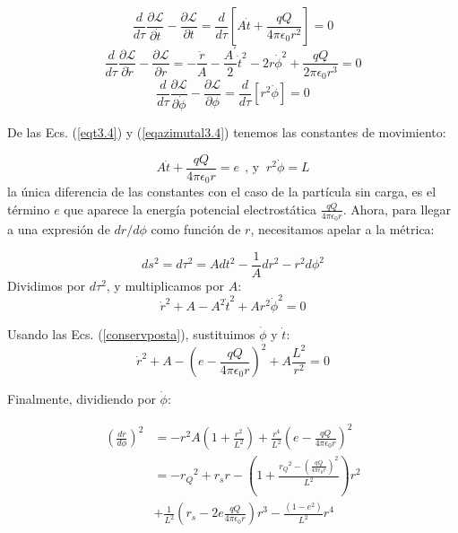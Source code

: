 \begin{equation}
\frac{d}{d\tau}\frac{\partial \mathcal{L}}{\partial \dot{t}} - \frac{\partial \mathcal{L}}{\partial t} = \frac{d}{d\tau}\left[ A\dot{t} + \frac{qQ}{4\pi\epsilon_0 r^2} \right]  = 0
\label{eqt3.4}
\end{equation}
\begin{equation}
    \frac{d}{d\tau}\frac{\partial \mathcal{L}}{\partial \dot{r}} - \frac{\partial \mathcal{L}}{\partial r} = -\frac{\ddot{r}}{A} - \frac{A^\prime}{2} \dot{t}^2 - 2 r \dot{\phi}^2 + \frac{qQ}{2\pi\epsilon_0 r^3}  = 0
\label{eqradial3.4}
\end{equation}
\begin{equation}
    \frac{d}{d\tau}\frac{\partial \mathcal{L}}{\partial \dot{\phi}} - \frac{\partial \mathcal{L}}{\partial \phi} =\frac{d}{d \tau}\left[ r^2 \dot{\phi} \right] = 0
\label{eqazimutal3.4}
\end{equation}

De las Ecs. (\ref{eqt3.4}) y (\ref{eqazimutal3.4}) tenemos las constantes de movimiento:

\begin{equation}
    A\dot{t} + \frac{qQ}{4\pi\epsilon_0 r} = e\ \ \text{, y }\ r^2 \dot{\phi} = L
\label{conservposta}
\end{equation}
la única diferencia de las constantes con el caso de la partícula sin carga, es el término $e$ que aparece la energía potencial electrostática $\frac{qQ}{4\pi\epsilon_0 r}$. Ahora, para llegar a una expresión de $dr/d\phi$ como función de $r$, necesitamos apelar a la métrica:

\begin{equation}
    ds^2=d\tau^2=Adt^2 - \frac{1}{A}dr^2- r^2d\phi^2
\end{equation}
Dividimos por $d\tau^2$, y multiplicamos por $A$:
\begin{equation}
    \dot{r}^2 + A - A^2 \dot{t}^2 + A r^2 \dot{\phi}^2 =0
\end{equation}

Usando las Ecs. (\ref{conservposta}), sustituimos $\dot{\phi}$ y $\dot{t}$:
\begin{equation}
    \dot{r}^2 + A - \left(e-\frac{qQ}{4\pi\epsilon_0 r}\right)^2 + A \frac{L^2}{r^2} =0
\end{equation}

Finalmente, dividiendo por $\dot{\phi}$:

\begin{equation}
\begin{split}
    \left( \frac{dr}{d\phi} \right)^2 &= -r^2 A\left(1+\frac{r^2}{L^2}\right) + \frac{r^4}{L^2}\left( e - \frac{qQ}{4\pi\epsilon_0 r} \right)^2\\
    &=-{r_Q}^2 + r_s r - \left( 1 + \frac{{r_Q}^2 - \left(\frac{qQ}{4\pi\epsilon_0 r}\right)^2}{L^2} \right) r^2 \\ &+ \frac{1}{L^2} \left(r_s - 2e\frac{qQ}{4\pi\epsilon_0 r}\right)r^3 - \frac{(1-e^2)}{L^2}r^4
\end{split}
\end{equation}

